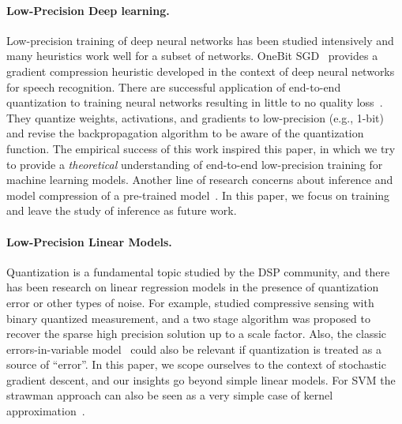 \documentclass{article}
\begin{document}
\vspace{-1em}
\paragraph{Low-Precision Deep learning.}

Low-precision training of deep neural networks has been studied
intensively and many heuristics work well for a subset of networks.
OneBit SGD~\cite{Frank:2014:Interspeech} provides
a gradient compression heuristic developed in the context of deep 
neural networks for speech recognition. There are successful 
application of end-to-end quantization to training neural networks
resulting in little to no quality loss~\cite{hubara2016quantized,
rastegari2016xnor,zhou2016dorefa,miyashita2016convolutional,li2016ternary,gupta2015deep}. They  quantize weights, activations, and gradients 
to low-precision (e.g., 1-bit) and revise the backpropagation 
algorithm to be aware of the quantization function.
The empirical success of this work inspired this paper, in which we try
to provide a {\em theoretical} understanding of end-to-end low-precision
training for machine learning models.
Another line of research concerns about inference and model
compression of a pre-trained model~\cite{vanhoucke2011improving,gong2014compressing,Han:2016:ICLR,lin2016fixed,kim2016bitwise,kim2015compression,wu2016quantized}.
In this paper, we focus on training and leave the study of
inference as future work.

\vspace{-1.2em}
\paragraph{Low-Precision Linear Models.}

Quantization is a fundamental topic studied by the
DSP community, and there has been research on
linear regression models in the presence of quantization
error or other types of noise. For example,
\citet{Gopi:2013:ICML} studied compressive sensing
with binary quantized measurement, and a two stage algorithm was proposed to recover the sparse high precision solution up to a scale factor.
Also, the
classic errors-in-variable model~\cite{Hall:2008:Book}
could also be relevant if quantization is treated 
as a source of ``error''. In this paper, we scope
ourselves to the context of stochastic gradient descent, 
and our insights go beyond simple linear models.
For SVM the strawman approach 
can also be seen as a very simple case of kernel 
approximation~\cite{Cortes:2010:AISTATS}.
\end{document}
